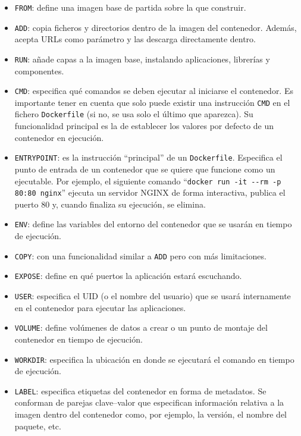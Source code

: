 \begin{itemize}
    \item \texttt{FROM}: define una imagen base de partida sobre la que construir.
    \item \texttt{ADD}: copia ficheros y directorios dentro de la imagen del 
          contenedor. Además, acepta URLs como parámetro y las descarga
          directamente dentro.
    \item \texttt{RUN}: añade capas a la imagen base, instalando aplicaciones,
          librerías y componentes.
    \item \texttt{CMD}: especifica qué comandos se deben ejecutar al iniciarse
          el contenedor. Es importante tener en cuenta que solo puede existir una
          instrucción \texttt{CMD} en el fichero \texttt{Dockerfile} (si no, se usa solo
          el último que aparezca). Su funcionalidad principal
          es la de establecer los valores por defecto de un contenedor en ejecución.
    \item \texttt{ENTRYPOINT}: es la instrucción ``principal'' de un \texttt{Dockerfile}.
          Especifica el punto de entrada de un contenedor que se quiere que funcione como
          un ejecutable. Por ejemplo, el siguiente comando ``\lstinline[style=bash]!docker run -it --rm -p 80:80 nginx!''
          ejecuta un servidor NGINX de forma interactiva, publica el puerto 80 y, cuando finaliza
          su ejecución, se elimina.
    \item \texttt{ENV}: define las variables del entorno del contenedor que se usarán
          en tiempo de ejecución.
    \item \texttt{COPY}: con una funcionalidad similar a \texttt{ADD} pero con
          más limitaciones.
    \item \texttt{EXPOSE}: define en qué puertos la aplicación estará escuchando.
    \item \texttt{USER}: especifica el UID (o el nombre del usuario) que se usará
          internamente en el contenedor para ejecutar las aplicaciones.
    \item \texttt{VOLUME}: define volúmenes de datos a crear o un punto de montaje del
          contenedor en tiempo de ejecución.
    \item \texttt{WORKDIR}: especifica la ubicación en donde se ejecutará el comando
          en tiempo de ejecución.
    \item \texttt{LABEL}: especifica etiquetas del contenedor en forma de metadatos.
          Se conforman de parejas clave--valor que especifican información relativa
          a la imagen dentro del contenedor como, por ejemplo, la versión, el nombre
          del paquete, etc.
\end{itemize}

